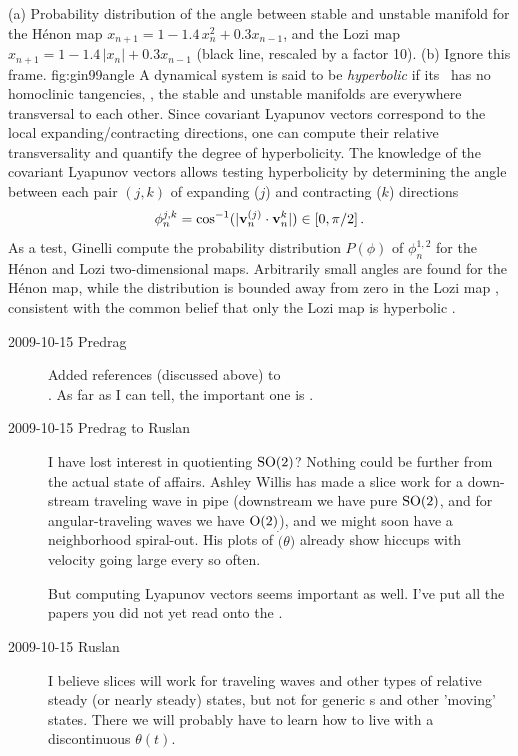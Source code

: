%
{}{
(a) Probability distribution of the angle between stable and
unstable manifold for the H\'enon map $x_{n+1} = 1 -1.4\,
x_n^2 + 0.3 x_{n-1}$, and the Lozi map $x_{n+1} = 1
-1.4\,|x_n| + 0.3 x_{n-1}$ (black line, rescaled by a factor
10). (b) Ignore this frame.
}{fig:gin99angle} %
%
%
A dynamical system is said to be \emph{hyperbolic} if its
\statesp\ has no homoclinic tangencies, \ie, the stable and
unstable manifolds are everywhere transversal to each other.
Since covariant Lyapunov vectors correspond to the local
expanding/contracting directions, one can compute their
relative transversality and quantify the degree of hyperbolicity.
The knowledge of the covariant Lyapunov vectors allows testing hyperbolicity by
determining the angle between each pair $(j,k)$ of expanding
($j$) and contracting ($k$) directions
\[
\phi_n^{j,k} = \cos^{-1}(|{\bf v}_n^{(j)} \cdot{\bf v}_n^k|) \in [0,\pi/2]
\,.
\]
As a test, Ginelli \etal{} compute the
probability distribution $P(\phi)$ of $\phi_n^{1,2}$ for the
H\'enon and Lozi two-dimensional maps. Arbitrarily small
angles are found for the H\'enon map, while the distribution
is bounded away from zero in the Lozi map ,
consistent with the common belief that
only the Lozi map is hyperbolic .

\begin{description}
\item[2009-10-15 Predrag]
Added references 
(discussed above) to
\\
. As far as I can tell, the important one is
.

\item[2009-10-15 Predrag to Ruslan]
I have lost interest in quotienting $\textrm{SO}(2)$? Nothing could
be further from the actual state of affairs. Ashley Willis
has made a slice work for a down-stream traveling wave in
pipe (downstream we have pure $\textrm{SO}(2)$, and for
angular-traveling waves we have $\textrm{O}(2)$), and we might soon have a
neighborhood spiral-out. His plots of $\dot(\theta)$ already
show hiccups with velocity going large every so often.

But computing Lyapunov vectors seems important as well. I've
put all the papers you did not yet read onto the
.

\item[2009-10-15 Ruslan]
I believe slices will work for traveling waves and other
types of relative steady (or nearly steady) states, but not
for generic \rpo s and other 'moving' states.  There we will
probably have to learn how to live with a discontinuous
$\theta(t)$.
\end{description}




\renewcommand{\ssp}{a}

